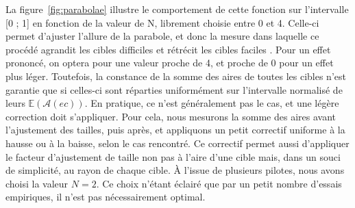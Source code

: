 	La figure~\ref{fig:parabolae} illustre le comportement de cette fonction sur l'intervalle [0 ; 1] en fonction de la valeur de N, librement choisie entre 0 et 4. Celle-ci permet d'ajuster l'allure de la parabole, et donc la mesure dans laquelle ce procédé agrandit les cibles \og difficiles \fg{} et rétrécit les cibles \og faciles \fg{}. Pour un effet prononcé, on optera pour une valeur proche de 4, et proche de 0 pour un effet plus léger. Toutefois, la constance de la somme des aires de toutes les cibles n'est garantie que si celles-ci sont réparties uniformément sur l'intervalle normalisé de leurs $\mathbb{E}(\mathcal{A}(ec))$.\footnotemark{} En pratique, ce n'est généralement pas le cas, et une légère correction doit s'appliquer. Pour cela, nous mesurons la somme des aires avant l'ajustement des tailles, puis après, et appliquons un petit correctif uniforme à la hausse ou à la baisse, selon le cas rencontré. Ce correctif permet aussi d'appliquer le facteur d'ajustement de taille non pas à l'aire d'une cible mais, dans un souci de simplicité, au rayon de chaque cible. À l'issue de plusieurs pilotes, nous avons choisi la valeur $N=2$. Ce choix n'étant éclairé que par un petit nombre d'essais empiriques, il n'est pas nécessairement optimal.
	
	
